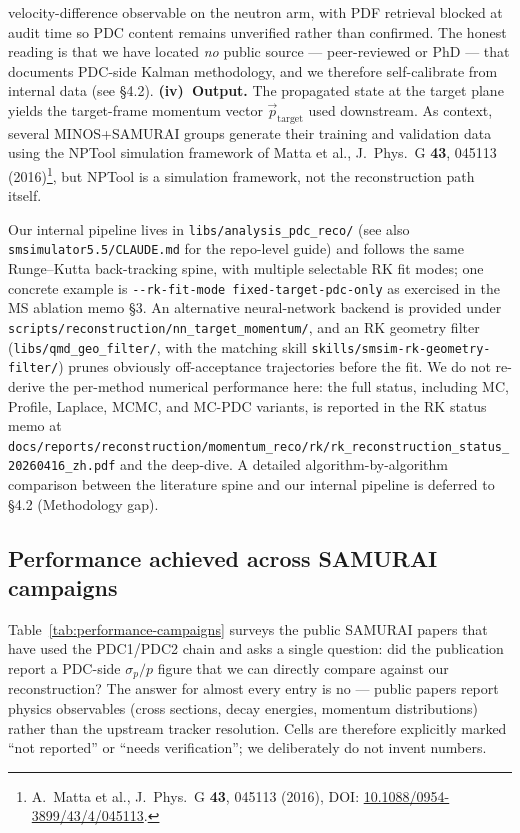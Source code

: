 \documentclass[a4paper, 11pt]{article}
\begin{document}
velocity-difference observable on the neutron arm, with PDF retrieval blocked at audit time so PDC content remains unverified rather than confirmed. The honest reading is that we have located \emph{no} public source --- peer-reviewed or PhD --- that documents PDC-side Kalman methodology, and we therefore self-calibrate from internal data (see §4.2). \textbf{(iv)~Output.} The propagated state at the target plane yields the target-frame momentum vector $\vec p_{\text{target}}$ used downstream. As context, several MINOS+SAMURAI groups generate their training and validation data using the NPTool simulation framework of Matta et al., J.\ Phys.\ G \textbf{43}, 045113 (2016)\footnote{\label{fn:matta2016}A.~Matta et al., J.\ Phys.\ G \textbf{43}, 045113 (2016), DOI: \href{https://doi.org/10.1088/0954-3899/43/4/045113}{10.1088/0954-3899/43/4/045113}.}, but NPTool is a simulation framework, not the reconstruction path itself.

Our internal pipeline lives in \texttt{libs/analysis\_pdc\_reco/} (see also \texttt{smsimulator5.5/CLAUDE.md} for the repo-level guide) and follows the same Runge--Kutta back-tracking spine, with multiple selectable RK fit modes; one concrete example is \texttt{-{}-rk-fit-mode fixed-target-pdc-only} as exercised in the MS ablation memo §3. An alternative neural-network backend is provided under \texttt{scripts/reconstruction/nn\_target\_momentum/}, and an RK geometry filter (\texttt{libs/qmd\_geo\_filter/}, with the matching skill \texttt{skills/smsim-rk-geometry-filter/}) prunes obviously off-acceptance trajectories before the fit. We do not re-derive the per-method numerical performance here: the full status, including MC, Profile, Laplace, MCMC, and MC-PDC variants, is reported in the RK status memo at \texttt{docs/reports/reconstruction/momentum\_reco/rk/rk\_reconstruction\_status\_20260416\_zh.pdf} and the deep-dive. A detailed algorithm-by-algorithm comparison between the literature spine and our internal pipeline is deferred to §4.2 (Methodology gap).

\subsection{Performance achieved across SAMURAI campaigns}
Table~\ref{tab:performance-campaigns} surveys the public SAMURAI papers that have used the PDC1/PDC2 chain and asks a single question: did the publication report a PDC-side $\sigma_p/p$ figure that we can directly compare against our reconstruction? The answer for almost every entry is no --- public papers report physics observables (cross sections, decay energies, momentum distributions) rather than the upstream tracker resolution. Cells are therefore explicitly marked ``not reported'' or ``needs verification''; we deliberately do not invent numbers.
\end{document}
